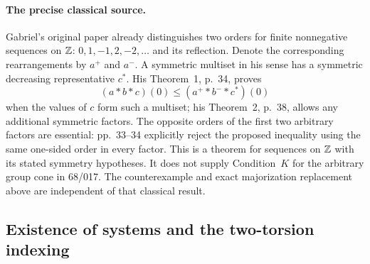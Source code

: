 \paragraph{The precise classical source.}
Gabriel's original paper \cite[\S1, pp.~32--34]{Gabriel1932C} already
distinguishes two orders for finite nonnegative sequences on ${\mathbb{Z}}$:
$0,1,-1,2,-2,\ldots$ and its reflection. Denote the corresponding
rearrangements by $a^+$ and $a^-$. A symmetric multiset in his sense
has a symmetric decreasing representative $c^*$. His Theorem~1,
p.~34, proves
\[
 (a*b*c)(0)\leq(a^+*b^-*c^*)(0)
\]
when the values of $c$ form such a multiset; his Theorem~2, p.~38,
allows any additional symmetric factors. The opposite orders of the
first two arbitrary factors are essential: pp.~33--34 explicitly
reject the proposed inequality using the same one-sided order in
every factor. This is a theorem for sequences on ${\mathbb{Z}}$ with its stated
symmetry hypotheses. It does not supply Condition~$K$ for the
arbitrary group cone in 68/017. The counterexample and exact
majorization replacement above are independent of that classical
result.

\subsection{Existence of systems and the two-torsion indexing}

